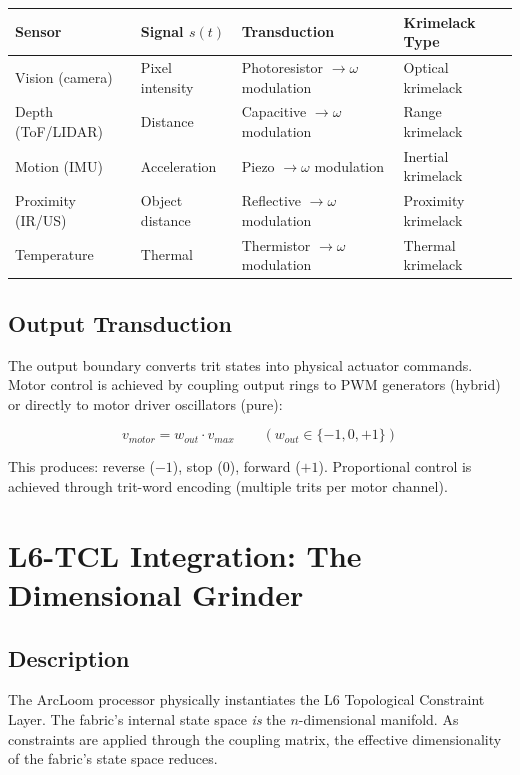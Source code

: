 \documentclass[11pt, a4paper]{article}
\begin{document}
\begin{center}
\begin{tabular}{@{}llll@{}}
\toprule
\textbf{Sensor} & \textbf{Signal $s(t)$} & \textbf{Transduction} & \textbf{Krimelack Type} \\
\midrule
Vision (camera) & Pixel intensity & Photoresistor $\to \omega$ modulation & Optical krimelack \\
Depth (ToF/LIDAR) & Distance & Capacitive $\to \omega$ modulation & Range krimelack \\
Motion (IMU) & Acceleration & Piezo $\to \omega$ modulation & Inertial krimelack \\
Proximity (IR/US) & Object distance & Reflective $\to \omega$ modulation & Proximity krimelack \\
Temperature & Thermal & Thermistor $\to \omega$ modulation & Thermal krimelack \\
\bottomrule
\end{tabular}
\end{center}

\subsection{Output Transduction}

The output boundary converts trit states into physical actuator commands.
Motor control is achieved by coupling output rings to PWM generators
(hybrid) or directly to motor driver oscillators (pure):

\begin{equation}
  v_{motor} = w_{out} \cdot v_{max} \qquad (w_{out} \in \{-1, 0, +1\})
\end{equation}

This produces: reverse ($-1$), stop ($0$), forward ($+1$). Proportional
control is achieved through trit-word encoding (multiple trits per motor
channel).

\section{L6-TCL Integration: The Dimensional Grinder}

\subsection{Description}

The ArcLoom processor physically instantiates the L6 Topological Constraint
Layer. The fabric's internal state space \textit{is} the $n$-dimensional
manifold. As constraints are applied through the coupling matrix, the
effective dimensionality of the fabric's state space reduces.
\end{document}
